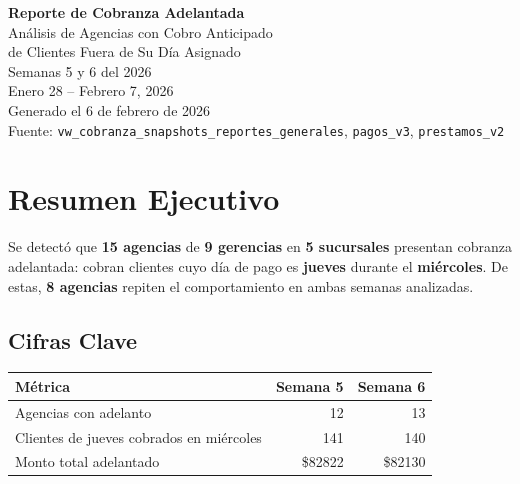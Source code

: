 \documentclass[11pt,a4paper]{article}
\newcommand{\money}[1]{\$\num{#1}}
\begin{document}
\thispagestyle{empty}
\vspace*{4cm}
\begin{center}
  {\Huge\bfseries\color{xpressblue} Reporte de Cobranza Adelantada}\\[0.8cm]
  {\Large\color{xpressgray} An\'alisis de Agencias con Cobro Anticipado\\de Clientes Fuera de Su D\'ia Asignado}\\[2cm]
  {\large Semanas 5 y 6 del 2026}\\[0.5cm]
  {\large Enero 28 -- Febrero 7, 2026}\\[3cm]
  {\normalsize\color{xpressgray} Generado el 6 de febrero de 2026}\\[0.3cm]
  {\normalsize\color{xpressgray} Fuente: \texttt{vw\_cobranza\_snapshots\_reportes\_generales},
  \texttt{pagos\_v3}, \texttt{prestamos\_v2}}
\end{center}
\newpage

\tableofcontents
\newpage

\section{Resumen Ejecutivo}

Se detect\'o que \textbf{15 agencias} de \textbf{9 gerencias} en \textbf{5 sucursales}
presentan cobranza adelantada: cobran clientes cuyo d\'ia de pago es \textbf{jueves}
durante el \textbf{mi\'ercoles}. De estas, \textbf{8 agencias} repiten el comportamiento
en ambas semanas analizadas.

\subsection{Cifras Clave}

\begin{center}
\renewcommand{\arraystretch}{1.4}
\begin{tabular}{lrr}
\toprule
\textbf{M\'etrica} & \textbf{Semana 5} & \textbf{Semana 6} \\
\midrule
Agencias con adelanto & 12 & 13 \\
Clientes de jueves cobrados en mi\'ercoles & 141 & 140 \\
Monto total adelantado & \money{82822} & \money{82130} \\
\bottomrule
\end{tabular}
\end{center}
\end{document}
